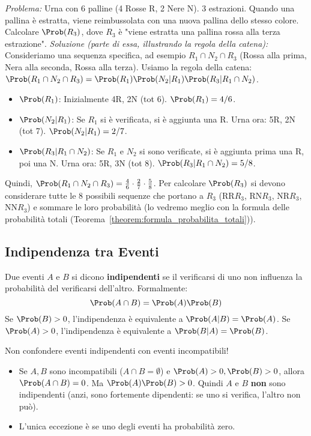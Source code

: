 \begin{example}
\textit{Problema:} Urna con 6 palline (4 Rosse R, 2 Nere N). 3 estrazioni. Quando una pallina è estratta, viene reimbussolata con una nuova pallina dello stesso colore. Calcolare $\Prob(R_3)$, dove $R_3$ è "viene estratta una pallina rossa alla terza estrazione".
\textit{Soluzione (parte di essa, illustrando la regola della catena):}
Consideriamo una sequenza specifica, ad esempio $R_1 \cap N_2 \cap R_3$ (Rossa alla prima, Nera alla seconda, Rossa alla terza).
Usiamo la regola della catena: $\Prob(R_1 \cap N_2 \cap R_3) = \Prob(R_1) \Prob(N_2|R_1) \Prob(R_3|R_1 \cap N_2)$.
\begin{itemize}
    \item $\Prob(R_1)$: Inizialmente 4R, 2N (tot 6). $\Prob(R_1) = 4/6$.
    \item $\Prob(N_2|R_1)$: Se $R_1$ si è verificata, si è aggiunta una R. Urna ora: 5R, 2N (tot 7). $\Prob(N_2|R_1) = 2/7$.
    \item $\Prob(R_3|R_1 \cap N_2)$: Se $R_1$ e $N_2$ si sono verificate, si è aggiunta prima una R, poi una N. Urna ora: 5R, 3N (tot 8). $\Prob(R_3|R_1 \cap N_2) = 5/8$.
\end{itemize}
Quindi, $\Prob(R_1 \cap N_2 \cap R_3) = \frac{4}{6} \cdot \frac{2}{7} \cdot \frac{5}{8}$.
Per calcolare $\Prob(R_3)$ si devono considerare tutte le 8 possibili sequenze che portano a $R_3$ (RR$R_3$, RN$R_3$, NR$R_3$, NN$R_3$) e sommare le loro probabilità (lo vedremo meglio con la formula delle probabilità totali (Teorema~\ref{theorem:formula_probabilita_totali})).
\end{example}

\subsection{Indipendenza tra Eventi}
\begin{definition}
Due eventi $A$ e $B$ si dicono \textbf{indipendenti} se il verificarsi di uno non influenza la probabilità del verificarsi dell'altro. Formalmente:
\[ \Prob(A \cap B) = \Prob(A) \Prob(B) \]
Se $\Prob(B)>0$, l'indipendenza è equivalente a $\Prob(A|B) = \Prob(A)$.
Se $\Prob(A)>0$, l'indipendenza è equivalente a $\Prob(B|A) = \Prob(B)$.
\end{definition}

\begin{remark}
Non confondere eventi indipendenti con eventi incompatibili!
\begin{itemize}
    \item Se $A, B$ sono incompatibili ($A \cap B = \emptyset$) e $\Prob(A)>0, \Prob(B)>0$, allora $\Prob(A \cap B) = 0$. Ma $\Prob(A)\Prob(B) > 0$. Quindi $A$ e $B$ \textbf{non} sono indipendenti (anzi, sono fortemente dipendenti: se uno si verifica, l'altro non può).
    \item L'unica eccezione è se uno degli eventi ha probabilità zero.
\end{itemize}
\end{remark}

